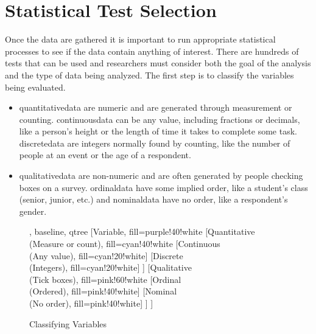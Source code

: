 \section{Statistical Test Selection}

Once the data are gathered it is important to run appropriate statistical processes to see if the data contain anything of interest. There are hundreds of tests that can be used and researchers must consider both the goal of the analysis and the type of data being analyzed. The first step is to classify the variables being evaluated. 

\begin{itemize}
	\item \Gls{quantitativedata} are numeric and are generated through measurement or counting. \gls{continuousdata} can be any value, including fractions or decimals, like a person's height or the length of time it takes to complete some task. \Gls{discretedata} are integers normally found by counting, like the number of people at an event or the age of a respondent.
	\item \Gls{qualitativedata} are non-numeric and are often generated by people checking boxes on a survey. \Gls{ordinaldata} have some implied order, like a student's class (senior, junior, etc.) and \gls{nominaldata} have no order, like a respondent's gender.
\end{itemize}

\begin{figure}[H]
	\centering

		
	\begin{forest}, baseline, qtree
		[Variable, fill=purple!40!white
			[{Quantitative\\(Measure or count)}, fill=cyan!40!white
				[{Continuous\\(Any value)}, fill=cyan!20!white]
				[{Discrete\\(Integers)}, fill=cyan!20!white]
			]
			[{Qualitative\\(Tick boxes)}, fill=pink!60!white
				[{Ordinal\\(Ordered)}, fill=pink!40!white]
				[{Nominal\\(No order)}, fill=pink!40!white]
			]
		]
	\end{forest}

	\caption{Classifying Variables}
	\label{fig06.08}
\end{figure}

